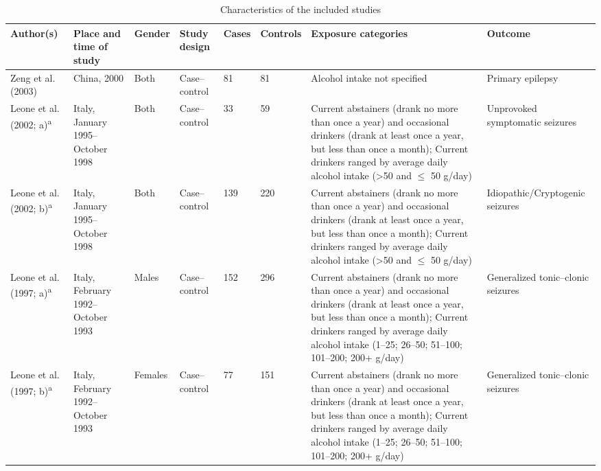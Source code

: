 \documentclass{article}
\begin{document}
\small


\begin{table}
    \centering
    \small %
    
    \caption{Characteristics of the included studies}
    \begin{threeparttable}
    \begin{tabular}{|p{2.5cm}|p{3cm}|p{1.5cm}|p{2cm}|p{1cm}|p{1cm}|p{7.5cm}|p{2cm}|}
    \hline
    \textbf{Author(s)} & \textbf{Place and time of study} & \textbf{Gender} & \textbf{Study design} & \textbf{Cases} & \textbf{Controls} & \textbf{Exposure categories} & \textbf{Outcome} \\ \hline
    Zeng et al. (2003) & China, 2000 & Both & Case--control & 81 & 81 & Alcohol intake not specified & Primary epilepsy \\ \hline
    Leone et al. (2002; a)\textsuperscript{a} & Italy, January 1995--October 1998 & Both & Case--control & 33 & 59 & Current abstainers (drank no more than once a year) and occasional drinkers (drank at least once a year, but less than once a month); Current drinkers ranged by average daily alcohol intake (>50 and $\leq$ 50 g/day) & Unprovoked symptomatic seizures \\ \hline
    Leone et al. (2002; b)\textsuperscript{a} & Italy, January 1995--October 1998 & Both & Case--control & 139 & 220 & Current abstainers (drank no more than once a year) and occasional drinkers (drank at least once a year, but less than once a month); Current drinkers ranged by average daily alcohol intake (>50 and $\leq$ 50 g/day) & Idiopathic/Cryptogenic seizures \\ \hline
    Leone et al. (1997; a)\textsuperscript{a} & Italy, February 1992--October 1993 & Males & Case--control & 152 & 296 & Current abstainers (drank no more than once a year) and occasional drinkers (drank at least once a year, but less than once a month); Current drinkers ranged by average daily alcohol intake (1--25; 26--50; 51--100; 101--200; 200+ g/day) & Generalized tonic--clonic seizures \\ \hline
    Leone et al. (1997; b)\textsuperscript{a} & Italy, February 1992--October 1993 & Females & Case--control & 77 & 151 & Current abstainers (drank no more than once a year) and occasional drinkers (drank at least once a year, but less than once a month); Current drinkers ranged by average daily alcohol intake (1--25; 26--50; 51--100; 101--200; 200+ g/day) & Generalized tonic--clonic seizures \\ \hline

\end{tabular}
\end{threeparttable}
\end{table}
\end{document}
